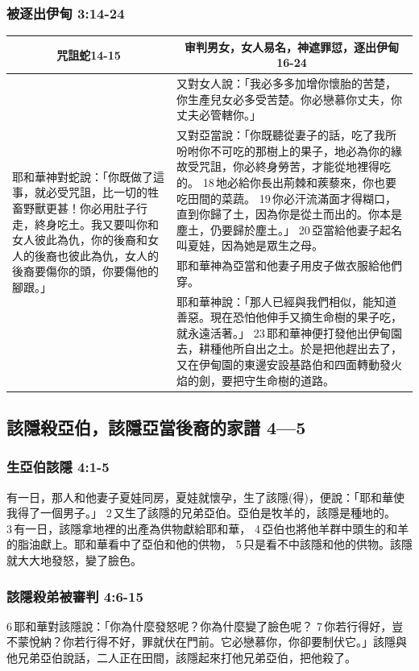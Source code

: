 \subsubsection{被逐出伊甸 3:14-24}
\begin{table}[H]
\centering
\begin{tabular}{p{3.5cm}|p{13.75cm}}\hline\hline
\multicolumn{1}{c|}{咒詛蛇14-15}&\multicolumn{1}{c}{审判男女，女人易名，神遮罪愆，逐出伊甸16-24}\\\hline
\multirow{4}{3.8cm}{耶和華神對蛇說：「你既做了這事，就必受咒詛，比一切的牲畜野獸更甚！你必用肚子行走，終身吃土。我又要叫你和女人彼此為仇，你的後裔和女人的後裔也彼此為仇，女人的後裔要傷你的頭，你要傷他的腳跟。」}
&又對女人說：「我必多多加增你懷胎的苦楚，你生產兒女必多受苦楚。你必戀慕你丈夫，你丈夫必管轄你。」\\\cline{2-2}
&又對亞當說：「你既聽從妻子的話，吃了我所吩咐你不可吃的那樹上的果子，地必為你的緣故受咒詛，你必終身勞苦，才能從地裡得吃的。 18 地必給你長出荊棘和蒺藜來，你也要吃田間的菜蔬。 19 你必汗流滿面才得糊口，直到你歸了土，因為你是從土而出的。你本是塵土，仍要歸於塵土。」 20 亞當給他妻子起名叫夏娃，因為她是眾生之母。\\\cline{2-2}
&耶和華神為亞當和他妻子用皮子做衣服給他們穿。\\\cline{2-2}
&耶和華神說：「那人已經與我們相似，能知道善惡。現在恐怕他伸手又摘生命樹的果子吃，就永遠活著。」 23 耶和華神便打發他出伊甸園去，耕種他所自出之土。於是把他趕出去了，又在伊甸園的東邊安設基路伯和四面轉動發火焰的劍，要把守生命樹的道路。\\\hline
\end{tabular}
\end{table}


\subsection{該隱殺亞伯，該隱亞當後裔的家譜 4—5}
\subsubsection{生亞伯該隱 4:1-5}
有一日，那人和他妻子夏娃同房，夏娃就懷孕，生了該隱(得)，便說：「耶和華使我得了一個男子。」 2 又生了該隱的兄弟亞伯。亞伯是牧羊的，該隱是種地的。 3 有一日，該隱拿地裡的出產為供物獻給耶和華， 4 亞伯也將他羊群中頭生的和羊的脂油獻上。耶和華看中了亞伯和他的供物， 5 只是看不中該隱和他的供物。該隱就大大地發怒，變了臉色。 


\subsubsection{該隱殺弟被審判 4:6-15 }
6 耶和華對該隱說：「你為什麼發怒呢？你為什麼變了臉色呢？ 7 你若行得好，豈不蒙悅納？你若行得不好，罪就伏在門前。它必戀慕你，你卻要制伏它。」該隱與他兄弟亞伯說話，二人正在田間，該隱起來打他兄弟亞伯，把他殺了。

